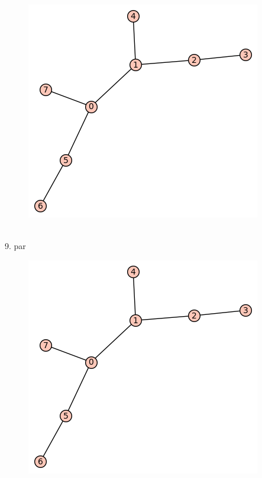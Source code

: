 \documentclass[12pt, a4paper]{article}
\begin{document}
\begin{figure}[h!]
\centering
\includegraphics[width=\linewidth]{t-30}
\end{figure} \\

9. par

\begin{figure}[h!]
\centering
\includegraphics[width=\linewidth]{t-30}
\end{figure} \\
\end{document}
